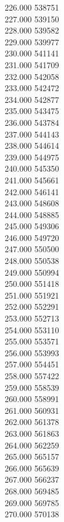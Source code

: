 { 226.000	538751 \\
 227.000	539150 \\
 228.000	539582 \\
 229.000	539977 \\
 230.000	541141 \\
 231.000	541709 \\
 232.000	542058 \\
 233.000	542472 \\
 234.000	542877 \\
 235.000	543475 \\
 236.000	543784 \\
 237.000	544143 \\
 238.000	544614 \\
 239.000	544975 \\
 240.000	545350 \\
 241.000	545661 \\
 242.000	546141 \\
 243.000	548608 \\
 244.000	548885 \\
 245.000	549306 \\
 246.000	549720 \\
 247.000	550500 \\
 248.000	550538 \\
 249.000	550994 \\
 250.000	551418 \\
 251.000	551921 \\
 252.000	552291 \\
 253.000	552713 \\
 254.000	553110 \\
 255.000	553571 \\
 256.000	553993 \\
 257.000	554451 \\
 258.000	557422 \\
 259.000	558539 \\
 260.000	558991 \\
 261.000	560931 \\
 262.000	561378 \\
 263.000	561863 \\
 264.000	562259 \\
 265.000	565157 \\
 266.000	565639 \\
 267.000	566237 \\
 268.000	569485 \\
 269.000	569785 \\
 270.000	570138 \\
}
